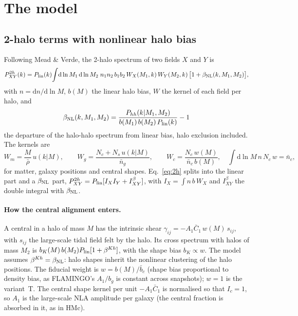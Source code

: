 \documentclass[11pt]{article}
\newcommand{\Plin}{P_{\rm lin}}
\newcommand{\bNL}{\beta_{\rm NL}}
\newcommand{\Cb}{\bar C_1}
\newcommand{\dd}{\mathrm{d}}
\newcommand{\nbar}{\bar n}
\newcommand{\Ib}[1]{I^{\beta}_{#1}}
\begin{document}
\section{The model}
\label{sec:model}

\subsection{2-halo terms with nonlinear halo bias}

Following Mead \& Verde, the 2-halo spectrum of two fields $X$ and $Y$ is
\begin{equation}
P^{2h}_{XY}(k) = \Plin(k)\!\int\!\dd\ln M_1\,\dd\ln M_2\; n_1 n_2\, b_1 b_2\,
W_X(M_1, k)\,W_Y(M_2, k)\,\big[1 + \bNL(k, M_1, M_2)\big],
\label{eq:2h}
\end{equation}
with $n = \dd n/\dd\ln M$, $b(M)$ the linear halo bias, $W$ the kernel of
each field per halo, and
\begin{equation}
\bNL(k, M_1, M_2) = \frac{P_{hh}(k | M_1, M_2)}{b(M_1)\,b(M_2)\,\Plin(k)} - 1
\label{eq:beta}
\end{equation}
the departure of the halo-halo spectrum from linear bias, halo exclusion
included. The kernels are
\begin{equation}
W_m = \frac{M}{\bar\rho}\,u(k|M),\qquad
W_g = \frac{N_c + N_s\,u(k|M)}{\nbar_g},\qquad
W_c = \frac{N_c\,w(M)}{\nbar_c\,b(M)},\quad
\int\!\dd\ln M\,n\,N_c\,w = \nbar_c ,
\end{equation}
for matter, galaxy positions and central shapes. Eq.~\eqref{eq:2h} splits
into the linear part and a $\bNL$ part,
$P^{2h}_{XY} = \Plin[I_X I_Y + \Ib{XY}]$, with $I_X = \int n\,b\,W_X$ and
$\Ib{XY}$ the double integral with $\bNL$.

\paragraph{How the central alignment enters.} A central in a halo of mass $M$
has the intrinsic shear $\gamma_{ij} = -A_1\Cb\,w(M)\,s_{ij}$, with $s_{ij}$
the large-scale tidal field felt by the halo. Its cross spectrum with halos of
mass $M_2$ is $b_K(M)\,b(M_2)\Plin[1 + \beta^{K h}]$, with the shape bias
$b_K \propto w$. The model assumes $\beta^{Kh} = \bNL$: halo shapes inherit
the nonlinear clustering of the halo positions. The fiducial weight is
$w = b(M)/\bar b_c$ (shape bias proportional to density bias, as FLAMINGO's
$A_1/b_g$ is constant across snapshots); $w = 1$ is the variant~T. The central
shape kernel per unit $-A_1\Cb$ is normalised so that $I_c = 1$, so $A_1$ is
the large-scale NLA amplitude per galaxy (the central fraction is absorbed in
it, as in HMc).
\end{document}
